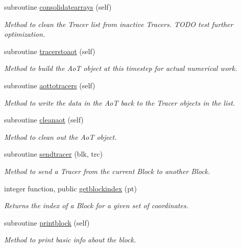 \begin{DoxyCompactItemize}
subroutine \mbox{\hyperlink{namespaceblocks__mod_a25ff530b5125e4cee5b1f474b2491883}{consolidatearrays}} (self)
\begin{DoxyCompactList}\small\item\em Method to clean the Tracer list from inactive Tracers. T\+O\+DO test further optimization. \end{DoxyCompactList}\item 
subroutine \mbox{\hyperlink{namespaceblocks__mod_ae7afa742f8f89a6a8afdefb7f8c87efd}{tracerstoaot}} (self)
\begin{DoxyCompactList}\small\item\em Method to build the AoT object at this timestep for actual numerical work. \end{DoxyCompactList}\item 
subroutine \mbox{\hyperlink{namespaceblocks__mod_a27c7e788c5f3979bfe9d43aad138286a}{aottotracers}} (self)
\begin{DoxyCompactList}\small\item\em Method to write the data in the AoT back to the Tracer objects in the list. \end{DoxyCompactList}\item 
subroutine \mbox{\hyperlink{namespaceblocks__mod_a6cc313e046daa2720cbca810d083faa0}{cleanaot}} (self)
\begin{DoxyCompactList}\small\item\em Method to clean out the AoT object. \end{DoxyCompactList}\item 
subroutine \mbox{\hyperlink{namespaceblocks__mod_a5a9992de40470e417ec8e40e688f6a0e}{sendtracer}} (blk, trc)
\begin{DoxyCompactList}\small\item\em Method to send a Tracer from the current Block to another Block. \end{DoxyCompactList}\item 
integer function, public \mbox{\hyperlink{namespaceblocks__mod_a62e8fb0d6b2535b4499c7a4d848c24ba}{getblockindex}} (pt)
\begin{DoxyCompactList}\small\item\em Returns the index of a Block for a given set of coordinates. \end{DoxyCompactList}\item 
subroutine \mbox{\hyperlink{namespaceblocks__mod_a6eab8b323cb15dcecb5c6b0c31b4e246}{printblock}} (self)
\begin{DoxyCompactList}\small\item\em Method to print basic info about the block. \end{DoxyCompactList}\item 

\end{DoxyCompactItemize}

